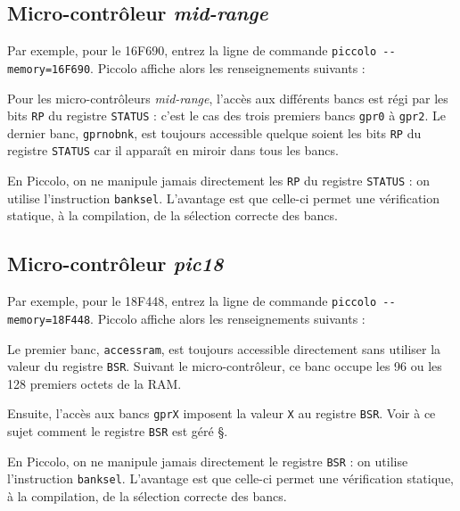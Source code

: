 \subsection{Micro-contrôleur \emph{mid-range}}

Par exemple, pour le 16F690, entrez la ligne de commande \texttt{piccolo -{}-memory=16F690}. Piccolo affiche alors les renseignements suivants :

{\footnotesize }

Pour les micro-contrôleurs \emph{mid-range}, l'accès aux différents bancs est régi par les bits \texttt{RP} du registre \texttt{STATUS} : c'est le cas des trois premiers bancs \texttt{gpr0} à \texttt{gpr2}. Le dernier banc, \texttt{gprnobnk}, est toujours accessible quelque soient les bits \texttt{RP} du registre \texttt{STATUS} car il apparaît en miroir dans tous les bancs.

En Piccolo, on ne manipule jamais directement les \texttt{RP} du registre \texttt{STATUS} : on utilise l'instruction \texttt{banksel}. L'avantage est que celle-ci permet une vérification statique, à la compilation, de la sélection correcte des bancs.


\subsection{Micro-contrôleur \emph{pic18}}

Par exemple, pour le 18F448, entrez la ligne de commande \texttt{piccolo -{}-memory=18F448}. Piccolo affiche alors les renseignements suivants :

{\footnotesize }

Le premier banc, \texttt{accessram}, est toujours accessible directement sans utiliser la valeur du registre \texttt{BSR}. Suivant le micro-contrôleur, ce banc occupe les 96 ou les 128 premiers octets de la RAM.

Ensuite, l'accès aux bancs \texttt{gprX} imposent la valeur \texttt{X} au registre \texttt{BSR}. Voir à ce sujet comment le registre \texttt{BSR} est géré §.

En Piccolo, on ne manipule jamais directement le registre \texttt{BSR} : on utilise l'instruction \texttt{banksel}. L'avantage est que celle-ci permet une vérification statique, à la compilation, de la sélection correcte des bancs.







